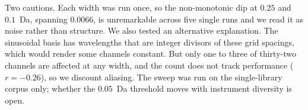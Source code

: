 Two cautions. Each width was run once, so the non-monotonic dip at $0.25$ and
$0.1$~Da, spanning $0.0066$, is unremarkable across five single runs and we read it
as noise rather than structure. We also tested an alternative explanation. The
sinusoidal basis has wavelengths that are integer divisors of these grid spacings,
which would render some channels constant. But only one to three of thirty-two
channels are affected at any width, and the count does not track performance
($r = -0.26$), so we discount aliasing. The sweep was run on the
single-library corpus only; whether the $0.05$~Da threshold moves with instrument
diversity is open.


